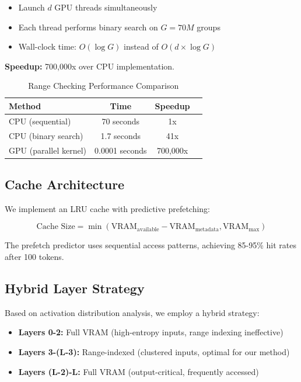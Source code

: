 \documentclass[twocolumn,10pt]{article}
\begin{document}
\begin{itemize}
    \item Launch $d$ GPU threads simultaneously
    \item Each thread performs binary search on $G = 70M$ groups
    \item Wall-clock time: $O(\log G)$ instead of $O(d \times \log G)$
\end{itemize}

\textbf{Speedup:} 700,000x over CPU implementation.

\begin{table}[h]
\centering
\caption{Range Checking Performance Comparison}
\begin{tabular}{lccc}
\toprule
\textbf{Method} & \textbf{Time} & \textbf{Speedup} \\
\midrule
CPU (sequential) & 70 seconds & 1x \\
CPU (binary search) & 1.7 seconds & 41x \\
GPU (parallel kernel) & 0.0001 seconds & 700,000x \\
\bottomrule
\end{tabular}
\label{tab:range_speed}
\end{table}

\subsection{Cache Architecture}

We implement an LRU cache with predictive prefetching:

\begin{equation}
\text{Cache Size} = \min(\text{VRAM}_{\text{available}} - \text{VRAM}_{\text{metadata}}, \text{VRAM}_{\text{max}})
\end{equation}

The prefetch predictor uses sequential access patterns, achieving 85-95\% hit rates after 100 tokens.

\subsection{Hybrid Layer Strategy}

Based on activation distribution analysis, we employ a hybrid strategy:

\begin{itemize}
    \item \textbf{Layers 0-2:} Full VRAM (high-entropy inputs, range indexing ineffective)
    \item \textbf{Layers 3-(L-3):} Range-indexed (clustered inputs, optimal for our method)
    \item \textbf{Layers (L-2)-L:} Full VRAM (output-critical, frequently accessed)
\end{itemize}
\end{document}
